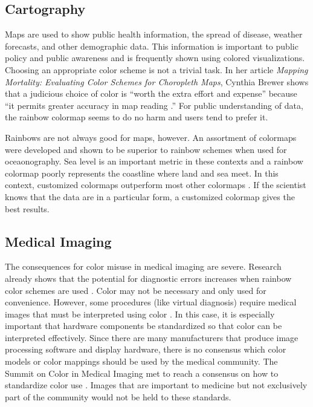 \documentclass[journal,12pt]{IEEEtran}
\begin{document}
\subsection{Cartography}

Maps are used to show public health information, the spread of disease, weather
forecasts, and other demographic data. This information is important to
 public policy and public awareness and is frequently shown
 using colored visualizations. Choosing an appropriate color scheme is not a trivial task. In her
article \textit{Mapping Mortality: Evaluating Color Schemes for Choropleth
Maps}, Cynthia Brewer shows that a judicious choice of color is ``worth 
the extra effort and expense'' because ``it permits greater accuracy in map
reading \cite{choropleth}.'' For public understanding of data, the rainbow colormap
seems to do no harm and users tend to prefer it.

Rainbows are not always good for maps, however. An assortment of colormaps were
developed and shown to be superior to rainbow schemes when used for oceaonography.
Sea level is an important metric in these contexts and a rainbow colormap poorly 
represents the coastline where land and sea meet. In this context, customized colormaps
outperform most other colormaps \cite{oceanography}. If the scientist knows that the data are in a particular form,
a customized colormap gives the best results.

\subsection{Medical Imaging}

The consequences for color misuse in medical imaging are severe. Research
already shows that the potential for diagnostic errors increases when 
rainbow color schemes are used \cite{arteryvis}. Color may not
be necessary and only used for convenience. However, some procedures (like virtual diagnosis) require 
medical images that must be interpreted using color \cite{standardmedimg}. In this case, it
is especially important that hardware components be standardized so that color
can be interpreted effectively. Since there are many manufacturers that produce
image processing software and display hardware, there is no consensus which 
color models or color mappings should be used by the medical community.
The Summit on Color in Medical Imaging
met to reach a consensus on how to standardize color use 
\cite{standardmedimg}. Images that are important to medicine but not exclusively
part of the community would not be held to these standards.
\end{document}
